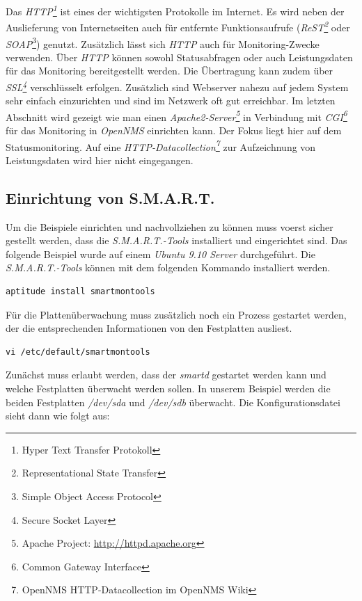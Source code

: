 Das \emph{HTTP\footnote{Hyper Text Transfer Protokoll}} ist eines der wichtigsten Protokolle im Internet. Es wird neben der Auslieferung von Internetseiten auch für entfernte Funktionsaufrufe (\emph{ReST\footnote{Representational State Transfer}} oder \emph{SOAP}\footnote{Simple Object Access Protocol}) genutzt. Zusätzlich lässt sich \emph{HTTP} auch für Monitoring-Zwecke verwenden. Über \emph{HTTP} können sowohl Statusabfragen oder auch Leistungsdaten für das Monitoring bereitgestellt werden. Die Übertragung kann zudem über \emph{SSL\footnote{Secure Socket Layer}} verschlüsselt erfolgen. Zusätzlich sind Webserver nahezu auf jedem System sehr einfach einzurichten und sind im Netzwerk oft gut erreichbar. Im letzten Abschnitt wird gezeigt wie man einen \emph{Apache2-Server\footnote{Apache Project: \url{http://httpd.apache.org}}} in Verbindung mit \emph{CGI\footnote{Common Gateway Interface}} für das Monitoring in \emph{OpenNMS} einrichten kann. Der Fokus liegt hier auf dem Statusmonitoring. Auf eine \emph{HTTP-Datacollection\footnote{OpenNMS HTTP-Datacollection im OpenNMS Wiki}} zur Aufzeichnung von Leistungsdaten wird hier nicht eingegangen.

\subsection{Einrichtung von S.M.A.R.T.}
Um die Beispiele einrichten und nachvollziehen zu können muss voerst sicher gestellt werden, dass die \emph{S.M.A.R.T.-Tools} installiert und eingerichtet sind. Das folgende Beispiel wurde auf einem \emph{Ubuntu 9.10 Server} durchgeführt. Die \emph{S.M.A.R.T.-Tools} können mit dem folgenden Kommando installiert werden.

\begin{lstlisting}[numbers=none]
aptitude install smartmontools
\end{lstlisting}

Für die Plattenüberwachung muss zusätzlich noch ein Prozess gestartet werden, der die entsprechenden Informationen von den Festplatten ausliest.

\begin{lstlisting}[numbers=none]
vi /etc/default/smartmontools
\end{lstlisting}

Zunächst muss erlaubt werden, dass der \emph{smartd} gestartet werden kann und welche Festplatten überwacht werden sollen. In unserem Beispiel werden die beiden Festplatten \emph{/dev/sda} und \emph{/dev/sdb} überwacht. Die Konfigurationsdatei sieht dann wie folgt aus:

